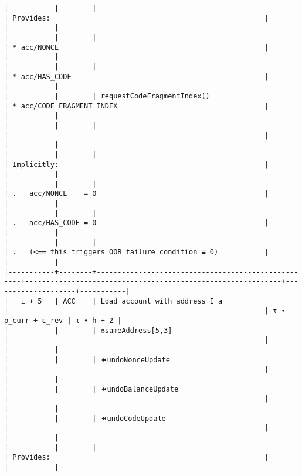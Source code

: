\documentclass[varwidth=\maxdimen,margin=0.5cm,multi={verbatim}]{standalone}
\begin{document}
\begin{verbatim}
|           |        |                                                    | Provides:                                                   |                    |           |
|           |        |                                                    | * acc/NONCE                                                 |                    |           |
|           |        |                                                    | * acc/HAS_CODE                                              |                    |           |
|           |        | requestCodeFragmentIndex()                         | * acc/CODE_FRAGMENT_INDEX                                   |                    |           |
|           |        |                                                    |                                                             |                    |           |
|           |        |                                                    | Implicitly:                                                 |                    |           |
|           |        |                                                    | .   acc/NONCE    = 0                                        |                    |           |
|           |        |                                                    | .   acc/HAS_CODE = 0                                        |                    |           |
|           |        |                                                    | .   (<== this triggers OOB_failure_condition ≡ 0)           |                    |           |
|-----------+--------+----------------------------------------------------+-------------------------------------------------------------+--------------------+-----------|
|   i + 5   | ACC    | Load account with address I_a                      |                                                             | τ ∙ ρ_curr + ε_rev | τ ∙ h + 2 |
|           |        | ♻️sameAddress[5,3]                                 |                                                             |                    |           |
|           |        | ⏪undoNonceUpdate                                  |                                                             |                    |           |
|           |        | ⏪undoBalanceUpdate                                |                                                             |                    |           |
|           |        | ⏪undoCodeUpdate                                   |                                                             |                    |           |
|           |        |                                                    | Provides:                                                   |                    |           |

\end{verbatim}
\end{document}
